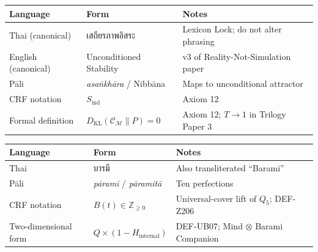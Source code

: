 \documentclass[12pt, a4paper]{article}
\begin{document}
\begin{langbox}[title={LANG-02 \textmd{---} เสถียรภาพอิสระ / Unconditioned Stability / $S_{\text{ind}}$}]
\begin{center}
\renewcommand{\arraystretch}{1.35}
\begin{tabular}{p{3.5cm} p{3.5cm} p{5.5cm}}
\toprule
\textbf{Language} & \textbf{Form} & \textbf{Notes}\\
\midrule
Thai (canonical) & เสถียรภาพอิสระ & Lexicon Lock; do not alter phrasing\\
English (canonical) & Unconditioned Stability & v3 of Reality-Not-Simulation paper\\
Pāli & \emph{asaṅkhāra} / Nibbāna & Maps to unconditional attractor\\
CRF notation & $S_{\text{ind}}$ & Axiom 12\\
Formal definition & $D_{\text{KL}}(\mathcal{C}_\mathcal{M}\|P) = 0$ &
  Axiom 12; $T \to 1$ in Trilogy Paper 3\\
\bottomrule
\end{tabular}
\end{center}
\end{langbox}

\begin{langbox}[title={LANG-03 \textmd{---} บารมี / Barami / $B$}]
\begin{center}
\renewcommand{\arraystretch}{1.35}
\begin{tabular}{p{3.5cm} p{3.5cm} p{5.5cm}}
\toprule
\textbf{Language} & \textbf{Form} & \textbf{Notes}\\
\midrule
Thai & บารมี & Also transliterated ``Barami''\\
Pāli & \emph{pāramī} / \emph{pāramitā} & Ten perfections\\
CRF notation & $B(t) \in \mathbb{Z}_{\geq 0}$ & Universal-cover lift of $Q_5$; DEF-Z206\\
Two-dimensional form & $Q \times (1 - H_{\text{internal}})$ &
  DEF-UB07; Mind $\otimes$ Barami Companion\\
\bottomrule
\end{tabular}
\end{center}
\end{langbox}
\end{document}
